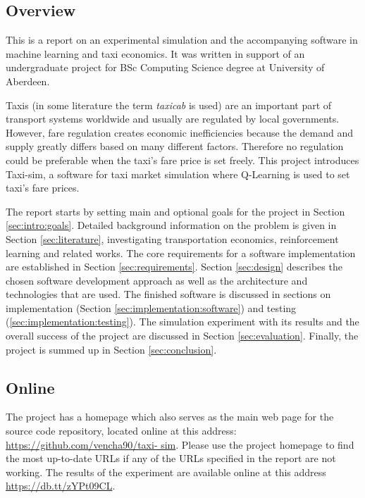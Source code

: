 \subsection{Overview}
\label{sec:intro:overview}

This is a report on an experimental simulation and the accompanying software in
machine learning and taxi economics. It was written in support of an
undergraduate project for BSc Computing Science degree at University of
Aberdeen.

Taxis (in some literature the term \textit{taxicab} is used) are an important
part of transport systems worldwide and usually are regulated by local
governments. However, fare regulation creates economic inefficiencies because
the demand and supply greatly differs based on many different factors.
Therefore no regulation could be preferable when the taxi's fare price is set
freely. This project introduces Taxi-sim, a software for taxi market simulation
where Q-Learning is used to set taxi's fare prices.

The report starts by setting main and optional goals for the project in Section
\ref{sec:intro:goals}. Detailed background information on the problem is given
in Section \ref{sec:literature}, investigating transportation economics,
reinforcement learning and related works. The core requirements for a software
implementation are established in Section \ref{sec:requirements}. Section
\ref{sec:design} describes the chosen software development approach as well as
the architecture and technologies that are used. The finished software is
discussed in sections on implementation (Section
\ref{sec:implementation:software}) and testing
(\ref{sec:implementation:testing}). The simulation experiment with its results
and the overall success of the project are discussed in Section
\ref{sec:evaluation}. Finally, the project is summed up in Section
\ref{sec:conclusion}.

\subsection{Online}
\label{sec:intro:online}

The project has a homepage which also serves as the main web page for the
source code repository, located online at this address:
\url{https://github.com/vencha90/taxi- sim}. Please use the project homepage to
find the most up-to-date URLs if any of the URLs specified in the report are
not working. The results of the experiment are available online at this address
\url{https://db.tt/zYPt09CL}.
